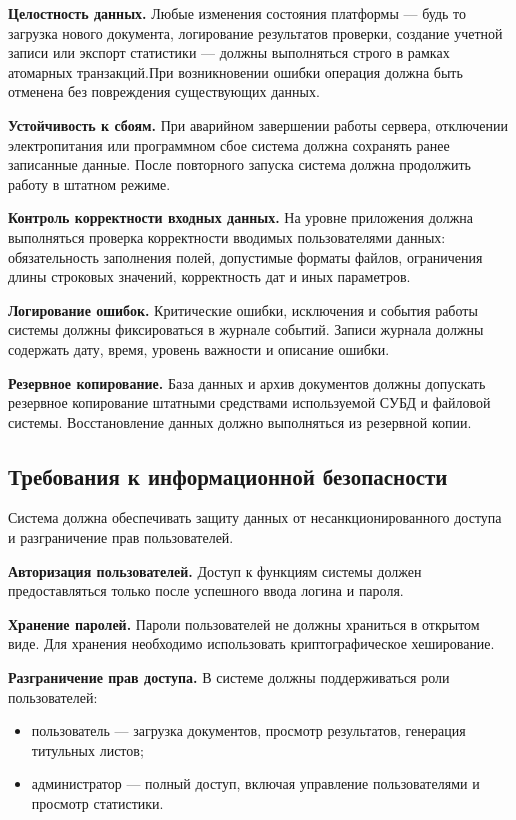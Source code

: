 \textbf{Целостность данных.}
Любые изменения состояния платформы — будь то загрузка нового документа, логирование результатов проверки, создание учетной записи или экспорт статистики — должны выполняться строго в рамках атомарных транзакций.При возникновении ошибки операция должна быть отменена без повреждения существующих данных.

\textbf{Устойчивость к сбоям.}
При аварийном завершении работы сервера, отключении электропитания или программном сбое система должна сохранять ранее записанные данные. После повторного запуска система должна продолжить работу в штатном режиме.

\textbf{Контроль корректности входных данных.}
На уровне приложения должна выполняться проверка корректности вводимых пользователями данных: обязательность заполнения полей, допустимые форматы файлов, ограничения длины строковых значений, корректность дат и иных параметров.

\textbf{Логирование ошибок.}
Критические ошибки, исключения и события работы системы должны фиксироваться в журнале событий. Записи журнала должны содержать дату, время, уровень важности и описание ошибки.

\textbf{Резервное копирование.}
База данных и архив документов должны допускать резервное копирование штатными средствами используемой СУБД и файловой системы. Восстановление данных должно выполняться из резервной копии.

\subsection{Требования к информационной безопасности}

Система должна обеспечивать защиту данных от несанкционированного доступа и разграничение прав пользователей.

\textbf{Авторизация пользователей.}
Доступ к функциям системы должен предоставляться только после успешного ввода логина и пароля.

\textbf{Хранение паролей.}
Пароли пользователей не должны храниться в открытом виде. Для хранения необходимо использовать криптографическое хеширование.

\textbf{Разграничение прав доступа.}
В системе должны поддерживаться роли пользователей:

\begin{itemize}
	\item пользователь --- загрузка документов, просмотр результатов, генерация титульных листов;
	\item администратор --- полный доступ, включая управление пользователями и просмотр статистики.
\end{itemize}


